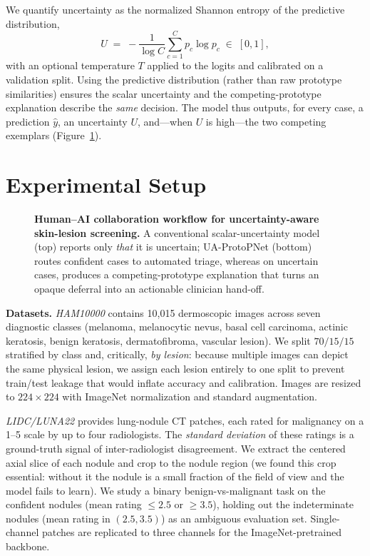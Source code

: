\documentclass[10pt]{article}
\newcommand{\method}{UA-ProtoPNet}
\begin{document}
We quantify uncertainty as the normalized Shannon entropy of the predictive
distribution,
\begin{equation}
U \;=\; -\frac{1}{\log C}\sum_{c=1}^{C} p_c \log p_c \;\in\; [0,1],
\end{equation}
with an optional temperature $T$ applied to the logits and calibrated on a
validation split. Using the predictive distribution (rather than raw prototype
similarities) ensures the scalar uncertainty and the competing-prototype
explanation describe the \emph{same} decision. The model thus outputs, for every
case, a prediction $\hat{y}$, an uncertainty $U$, and---when $U$ is high---the
two competing exemplars (Figure~\ref{fig:workflow}).


\section{Experimental Setup}
\label{sec:setup}

%   
\begin{figure}[!htbp]\centering
    \resizebox{\textwidth}{!}{%
      
    }%
  \caption{\textbf{Human--AI collaboration workflow for uncertainty-aware
  skin-lesion screening.} A conventional scalar-uncertainty model (top) reports
  only \emph{that} it is uncertain; \method{} (bottom) routes confident cases to
  automated triage, whereas on uncertain cases, produces a competing-prototype
  explanation that turns an opaque deferral into an actionable clinician
  hand-off.}
  \label{fig:workflow}
\end{figure}

\textbf{Datasets.} \emph{HAM10000} \parencite{tschandl2018ham10000} contains
10{,}015 dermoscopic images across seven diagnostic classes (melanoma,
melanocytic nevus, basal cell carcinoma, actinic keratosis, benign keratosis,
dermatofibroma, vascular lesion). We split $70/15/15$ stratified by class and,
critically, \emph{by lesion}: because multiple images can depict the same
physical lesion, we assign each lesion entirely to one split to prevent
train/test leakage that would inflate accuracy and calibration. Images are
resized to $224{\times}224$ with ImageNet normalization and standard
augmentation.

\emph{LIDC/LUNA22} \parencite{armato2011lidc, venkadesh2022luna22} provides lung-nodule
CT patches, each rated for malignancy on a 1--5 scale by up to four radiologists.
The \emph{standard deviation} of these ratings is a ground-truth signal of
inter-radiologist disagreement. We extract the centered axial slice of each
nodule and crop to the nodule region (we found this crop essential: without it
the nodule is a small fraction of the field of view and the model fails to
learn). We study a binary benign-vs-malignant task on the confident nodules
(mean rating $\le 2.5$ or $\ge 3.5$), holding out the indeterminate nodules
(mean rating in $(2.5,3.5)$) as an ambiguous evaluation set. Single-channel
patches are replicated to three channels for the ImageNet-pretrained backbone.
\end{document}
